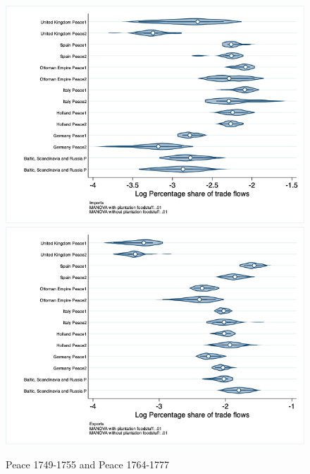 \documentclass[12pt,a4paper,notitlepage,english]{article}
\begin{document}
\begin{appendix}
\begin{figure}[h!]
\centering
\caption{Peace 1749-1755 and Peace 1764-1777}
\label{seven_peace1764_1777_nat_distr_pays7}
\includegraphics[scale=.4]{peace1749_1755_peace1764_1777_nat_distr_Ipays7}
\includegraphics[scale=.4]{peace1749_1755_peace1764_1777_nat_distr_Xpays7}
\end{figure}


\end{appendix}
\end{document}
